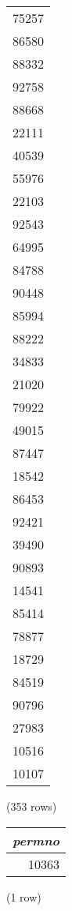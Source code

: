 \begin{tabular}{r}
75257 \\
86580 \\
88332 \\
92758 \\
88668 \\
22111 \\
40539 \\
55976 \\
22103 \\
92543 \\
64995 \\
84788 \\
90448 \\
85994 \\
88222 \\
34833 \\
21020 \\
79922 \\
49015 \\
87447 \\
18542 \\
86453 \\
92421 \\
39490 \\
90893 \\
14541 \\
85414 \\
78877 \\
18729 \\
84519 \\
90796 \\
27983 \\
10516 \\
10107 \\
\end{tabular}

\noindent (353 rows) \\

\begin{tabular}{r}
\textit{permno} \\
\hline
10363 \\
\end{tabular}

\noindent (1 row) \\

